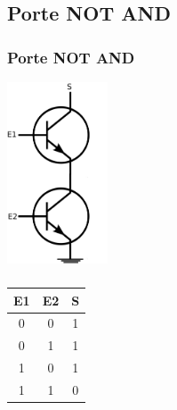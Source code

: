 \documentclass[svgnames,11pt]{beamer}
\begin{document}
\subsection{Porte NOT AND}
\begin{frame}
    \frametitle{Porte NOT AND}
    \begin{center}
        \centering
        \includegraphics[width=3cm]{ressources/schema-nand.png}
        \label{IMG}
    \end{center}


\end{frame}
\begin{frame}
    \frametitle{}

    \begin{center}
        \begin{tabular}{|c|c|c|}
            \hline
            E1 & E2 & S \\
            \hline
            0  & 0  & 1 \\
            \hline
            0  & 1  & 1 \\
            \hline
            1  & 0  & 1 \\
            \hline
            1  & 1  & 0 \\
            \hline
        \end{tabular}
    \end{center}

\end{frame}
\end{document}
